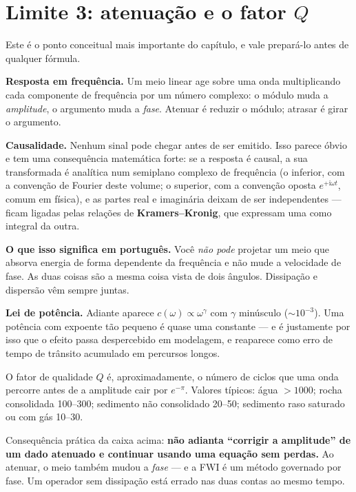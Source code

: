 \documentclass[11pt,a4paper,oneside]{report}
\begin{document}
\section{Limite 3: atenua\c{c}\~ao e o fator $Q$}

\begin{matematica}
Este \'e o ponto conceitual mais importante do cap\'itulo, e vale prepar\'a-lo
antes de qualquer f\'ormula.

\textbf{Resposta em frequ\^encia.} Um meio linear age sobre uma onda
multiplicando cada componente de frequ\^encia por um n\'umero complexo: o
m\'odulo muda a \emph{amplitude}, o argumento muda a \emph{fase}. Atenuar \'e
reduzir o m\'odulo; atrasar \'e girar o argumento.

\textbf{Causalidade.} Nenhum sinal pode chegar antes de ser emitido. Isso
parece \'obvio e tem uma consequ\^encia matem\'atica forte: se a resposta \'e
causal, a sua transformada \'e anal\'itica num semiplano complexo de
frequ\^encia (o inferior, com a conven\c{c}\~ao de Fourier deste volume; o
superior, com a conven\c{c}\~ao oposta $e^{+\mathrm{i}\omega t}$, comum em
f\'isica), e as partes real e imagin\'aria deixam de ser independentes --- ficam ligadas pelas
rela\c{c}\~oes de \textbf{Kramers--Kronig}, que expressam uma como integral da
outra.

\textbf{O que isso significa em portugu\^es.} Voc\^e \emph{n\~ao pode}
projetar um meio que absorva energia de forma dependente da frequ\^encia e
n\~ao mude a velocidade de fase. As duas coisas s\~ao a mesma coisa vista de
dois \^angulos. Dissipa\c{c}\~ao e dispers\~ao v\^em sempre juntas.

\textbf{Lei de pot\^encia.} Adiante aparece $c(\omega) \propto
\omega^{\gamma}$ com $\gamma$ min\'usculo ($\sim 10^{-3}$). Uma pot\^encia com
expoente t\~ao pequeno \'e quase uma constante --- e \'e justamente por isso
que o efeito passa despercebido em modelagem, e reaparece como erro de tempo
de tr\^ansito acumulado em percursos longos.
\end{matematica}

O fator de qualidade $Q$ \'e, aproximadamente, o n\'umero de ciclos que uma
onda percorre antes de a amplitude cair por $e^{-\pi}$. Valores t\'ipicos:
\'agua $>1000$; rocha consolidada 100--300; sedimento n\~ao consolidado
20--50; sedimento raso saturado ou com g\'as 10--30.

\begin{teoria}
Consequ\^encia pr\'atica da caixa acima: \textbf{n\~ao adianta ``corrigir a
amplitude'' de um dado atenuado e continuar usando uma equa\c{c}\~ao sem
perdas.} Ao atenuar, o meio tamb\'em mudou a \emph{fase} --- e a FWI \'e um
m\'etodo governado por fase. Um operador sem dissipa\c{c}\~ao est\'a errado nas
duas contas ao mesmo tempo.
\end{teoria}
\end{document}
